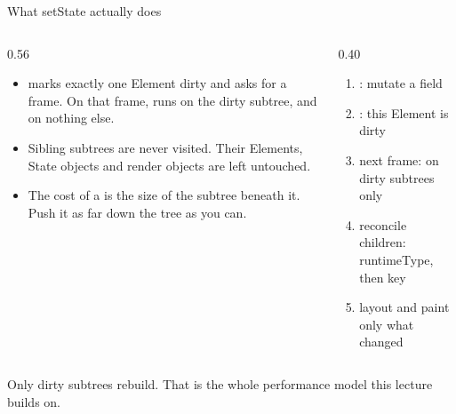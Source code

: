\documentclass[10pt,aspectratio=169,t]{beamer}
\begin{document}
\begin{frame}[eyebrow=Rendering]{What setState actually does}
  \begin{columns}[T]
    \begin{column}{0.56\textwidth}
      \begin{itemize}
        \item {} marks exactly one Element dirty and asks for a frame. On that frame,  runs on the dirty subtree, and on nothing else.
        \item Sibling subtrees are never visited. Their Elements, State objects and render objects are left untouched.
        \item The cost of a  is the size of the subtree beneath it. Push it as far down the tree as you can.
      \end{itemize}
    \end{column}
    \begin{column}{0.40\textwidth}
      \begin{enumerate}
        \item {}: mutate a field
        \item {}: this Element is dirty
        \item next frame:  on dirty subtrees only
        \item reconcile children: runtimeType, then key
        \item layout and paint only what changed
      \end{enumerate}
    \end{column}
  \end{columns}
  \begin{takeaway}{Only dirty subtrees rebuild.}
    That is the whole performance model this lecture builds on.
  \end{takeaway}
\end{frame}
\end{document}
